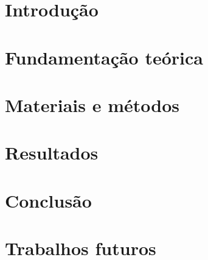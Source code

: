 \documentclass[oneside,monografia]{iftex2020}
\begin{document}
\maketitle

\chapter{Introdução} \label{cap:introducao}



\chapter{Fundamentação teórica}




%  

\chapter{Materiais e métodos}



\chapter{Resultados} \label{capitulo:ferramentas_uteis}



\chapter{Conclusão}



\chapter{Trabalhos futuros}
\end{document}
